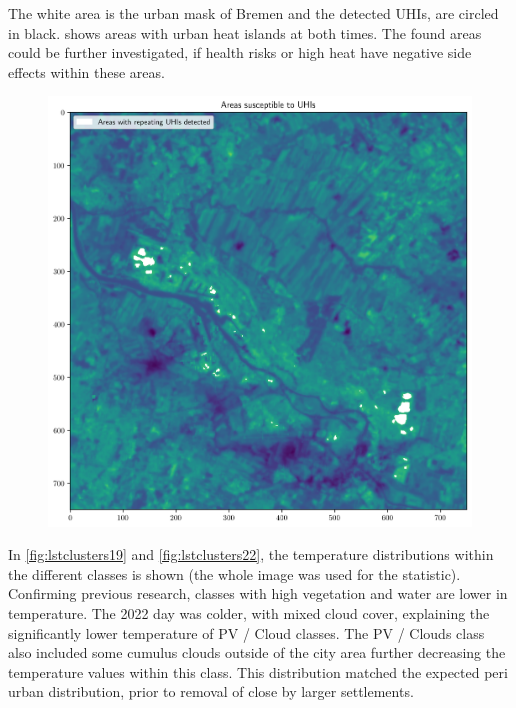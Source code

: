 \documentclass[12pt,a4paper, english,twoside]{scrartcl}
\begin{document}
   The white area is the urban mask of Bremen and the detected \glspl{UHI}, are circled in black. 
    shows areas with urban heat islands at both times. 
   The found areas could be further investigated, if health risks or high heat have negative side effects within these areas.\\
      \begin{figure}[!p]
          \centering
          \includegraphics[width=\textwidth]{img/overlap.png}
         \label{fig:uhiAffected}
      \end{figure}
      In \cref{fig:lstclusters19} and \cref{fig:lstclusters22}, the temperature distributions within the different classes is shown (the whole image was used for the statistic). 
      Confirming previous research, classes with high vegetation and water are lower in temperature. 
      The 2022 day was colder, with mixed cloud cover, explaining the significantly lower temperature of PV / Cloud classes.
      The PV / Clouds class also included some cumulus clouds outside of the city area further decreasing the temperature values within this class. 
      This distribution matched the expected peri urban distribution, prior to removal of close by larger settlements. 
\end{document}
